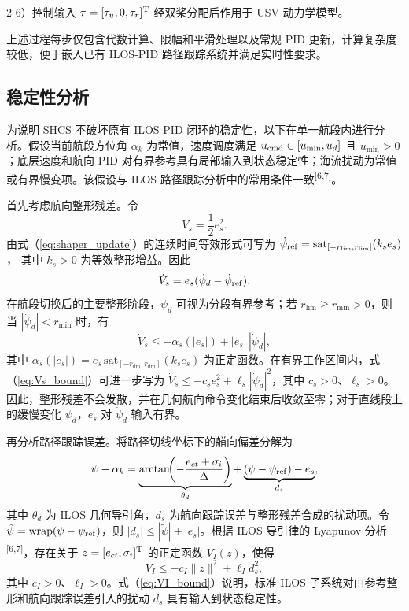 \documentclass[authordraft]{ctacn}
\begin{document}
\begin{multicols}{2}
6）控制输入 $\tau=[\tau_u,0,\tau_r]^{\rm T}$ 经双桨分配后作用于 USV 动力学模型。

上述过程每步仅包含代数计算、限幅和平滑处理以及常规 PID 更新，计算复杂度较低，便于嵌入已有 ILOS-PID 路径跟踪系统并满足实时性要求。

\subsection{稳定性分析}

为说明 SHCS 不破坏原有 ILOS-PID 闭环的稳定性，以下在单一航段内进行分析。假设当前航段方位角 $\alpha_k$ 为常值，速度调度满足 $u_{\rm cmd}\in[u_{\min},u_d]$ 且 $u_{\min}>0$；底层速度和航向 PID 对有界参考具有局部输入到状态稳定性；海流扰动为常值或有界慢变项。该假设与 ILOS 路径跟踪分析中的常用条件一致\textsuperscript{[6,7]}。

首先考虑航向整形残差。令
\begin{equation}
V_s=\frac{1}{2}e_s^2 .
\end{equation}
由式（\ref{eq:shaper_update}）的连续时间等效形式可写为
$\dot{\psi}_{\rm ref}=\mathrm{sat}_{[-r_{\lim},r_{\lim}]}(k_s e_s)$，
其中 $k_s>0$ 为等效整形增益。因此
\begin{equation}
\dot V_s=e_s(\dot\psi_d-\dot\psi_{\rm ref}) .
\end{equation}
在航段切换后的主要整形阶段，$\psi_d$ 可视为分段有界参考；若 $r_{\lim}\ge r_{\min}>0$，则当 $|\dot\psi_d|<r_{\min}$ 时，有
\begin{equation}
\dot V_s\leq -\alpha_s(|e_s|)+|e_s|\,|\dot\psi_d|,
\label{eq:Vs_bound}
\end{equation}
其中 $\alpha_s(|e_s|)=e_s\,\mathrm{sat}_{[-r_{\lim},r_{\lim}]}(k_s e_s)$ 为正定函数。在有界工作区间内，式（\ref{eq:Vs_bound}）可进一步写为 $\dot V_s\leq -c_s e_s^2+\ell_s|\dot\psi_d|^2$，其中 $c_s>0$、$\ell_s>0$。因此，整形残差不会发散，并在几何航向命令变化结束后收敛至零；对于直线段上的缓慢变化 $\psi_d$，$e_s$ 对 $\dot\psi_d$ 输入有界。

再分析路径跟踪误差。将路径切线坐标下的艏向偏差分解为
\begin{equation}
\psi - \alpha_k = \underbrace{\arctan\!\!\left(-\frac{e_{ct}+\sigma_i}{\Delta}\right)}_{\theta_d} + \underbrace{(\psi - \psi_{\rm ref}) - e_s}_{d_s},
\label{eq:psi_decomp}
\end{equation}
其中 $\theta_d$ 为 ILOS 几何导引角，$d_s$ 为航向跟踪误差与整形残差合成的扰动项。令 $\tilde\psi=\mathrm{wrap}(\psi-\psi_{\rm ref})$，则 $|d_s|\leq |\tilde\psi|+|e_s|$。根据 ILOS 导引律的 Lyapunov 分析\textsuperscript{[6,7]}，存在关于 $z=[e_{ct},\sigma_i]^{\rm T}$ 的正定函数 $V_I(z)$，使得
\begin{equation}
\dot V_I \leq -c_I\|z\|^2+\ell_I d_s^2,
\label{eq:VI_bound}
\end{equation}
其中 $c_I>0$、$\ell_I>0$。式（\ref{eq:VI_bound}）说明，标准 ILOS 子系统对由参考整形和航向跟踪误差引入的扰动 $d_s$ 具有输入到状态稳定性。


\end{multicols}
\end{document}
